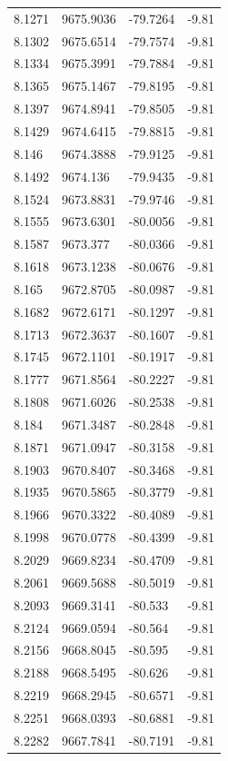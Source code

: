 \begin{table}[H]
\begin{tabular}{llll}
8.1271 & 9675.9036 & -79.7264 & -9.81 \\
8.1302 & 9675.6514 & -79.7574 & -9.81 \\
8.1334 & 9675.3991 & -79.7884 & -9.81 \\
8.1365 & 9675.1467 & -79.8195 & -9.81 \\
8.1397 & 9674.8941 & -79.8505 & -9.81 \\
8.1429 & 9674.6415 & -79.8815 & -9.81 \\
8.146 & 9674.3888 & -79.9125 & -9.81 \\
8.1492 & 9674.136 & -79.9435 & -9.81 \\
8.1524 & 9673.8831 & -79.9746 & -9.81 \\
8.1555 & 9673.6301 & -80.0056 & -9.81 \\
8.1587 & 9673.377 & -80.0366 & -9.81 \\
8.1618 & 9673.1238 & -80.0676 & -9.81 \\
8.165 & 9672.8705 & -80.0987 & -9.81 \\
8.1682 & 9672.6171 & -80.1297 & -9.81 \\
8.1713 & 9672.3637 & -80.1607 & -9.81 \\
8.1745 & 9672.1101 & -80.1917 & -9.81 \\
8.1777 & 9671.8564 & -80.2227 & -9.81 \\
8.1808 & 9671.6026 & -80.2538 & -9.81 \\
8.184 & 9671.3487 & -80.2848 & -9.81 \\
8.1871 & 9671.0947 & -80.3158 & -9.81 \\
8.1903 & 9670.8407 & -80.3468 & -9.81 \\
8.1935 & 9670.5865 & -80.3779 & -9.81 \\
8.1966 & 9670.3322 & -80.4089 & -9.81 \\
8.1998 & 9670.0778 & -80.4399 & -9.81 \\
8.2029 & 9669.8234 & -80.4709 & -9.81 \\
8.2061 & 9669.5688 & -80.5019 & -9.81 \\
8.2093 & 9669.3141 & -80.533 & -9.81 \\
8.2124 & 9669.0594 & -80.564 & -9.81 \\
8.2156 & 9668.8045 & -80.595 & -9.81 \\
8.2188 & 9668.5495 & -80.626 & -9.81 \\
8.2219 & 9668.2945 & -80.6571 & -9.81 \\
8.2251 & 9668.0393 & -80.6881 & -9.81 \\
8.2282 & 9667.7841 & -80.7191 & -9.81 \\

\end{tabular}
\end{table}
